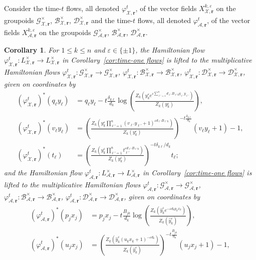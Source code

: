 \documentclass{amsart}
\newtheorem{corollary}[theorem]{Corollary}
\numberwithin{equation}{section}
\newcommand{\bfr}{{\boldsymbol{r}}}
\newcommand{\cA}{\mathcal{A}}
\newcommand{\cB}{\mathcal{B}}
\newcommand{\cD}{\mathcal{D}}
\newcommand{\cG}{\mathcal{G}}
\newcommand{\cX}{\mathcal{X}}
\begin{document}
Consider the time-$t$ flows, all denoted $\varphi_{\cX,\bfr}^t$, of the vector fields $X_{\cX,\bfr}^{k,\varepsilon}$ on the groupoids $\cG^\times_{\cX,\bfr}$, $\cB^\times_{\cX,\bfr}$, $\cD^\times_{\cX,\bfr}$ and the time-$t$ flows, all denoted $\varphi_{\cA,\bfr}^t$, of the vector fields $X_{\cA,\bfr}^{k,\varepsilon}$ on the groupoids $\cG^\times_{\cA,\bfr}$, $\cB^\times_{\cA,\bfr}$, $\cD^\times_{\cA,\bfr}$.
\begin{corollary}
  \label{cor:groupoid hamiltonian flows}
  For $1\le k\le n$ and $\varepsilon\in\{\pm1\}$, the Hamiltonian flow $\varphi_{\cX,\bfr}^t: L^\times_{\cX,\bfr} \to L^\times_{\cX,\bfr}$ in Corollary~\ref{cor:time-one flows} is lifted to the multiplicative Hamiltonian flows $\varphi_{\cX,\bfr}^t: \cG^\times_{\cX,\bfr} \to \cG^\times_{\cX,\bfr}$, $\varphi_{\cX,\bfr}^t: \cB^\times_{\cX,\bfr} \to \cB^\times_{\cX,\bfr}$, $\varphi_{\cX,\bfr}^t: \cD^\times_{\cX,\bfr} \to \cD^\times_{\cX,\bfr}$, given on coordinates by
  \begin{align*}
    (\varphi_{\cX,\bfr}^t)^*(q_\ell y_\ell)&=q_\ell y_\ell-t\frac{\delta_{k\ell}}{d_k}\log\left(\frac{Z_k\left(y_k^\varepsilon e^{\varepsilon\sum_{\ell'=1}^n d_{\ell'} B_{\ell' k}q_{\ell'} y_{\ell'}}\right)}{Z_k(y_k^\varepsilon)}\right),\\
    (\varphi_{\cX,\bfr}^t)^*(v_\ell y_\ell)&=\left(\frac{Z_k\left(y_k^\varepsilon \prod_{\ell'=1}^n (v_{\ell'} y_{\ell'} + 1)^{\varepsilon d_{\ell'} B_{\ell' k}}\right)}{Z_k(y_k^\varepsilon)}\right)^{-t\frac{\delta_{k\ell}}{d_k}}(v_\ell y_\ell+1)-1,\\
    (\varphi_{\cX,\bfr}^t)^*(t_\ell)&=\left(\frac{Z_k\left(y_k^\varepsilon \prod_{\ell'=1}^n t_{\ell'}^{\varepsilon d_{\ell'} B_{\ell' k}}\right)}{Z_k(y_k^\varepsilon)}\right)^{-t\delta_{k\ell}/d_k}t_\ell;
  \end{align*}
  and the Hamiltonian flow $\varphi_{\cA,\bfr}^t: L^\times_{\cA,\bfr} \to L^\times_{\cA,\bfr}$ in Corollary~\ref{cor:time-one flows} is lifted to the multiplicative Hamiltonian flows $\varphi_{\cA,\bfr}^t: \cG^\times_{\cA,\bfr} \to \cG^\times_{\cA,\bfr}$, $\varphi_{\cA,\bfr}^t: \cB^\times_{\cA,\bfr} \to \cB^\times_{\cA,\bfr}$, $\varphi_{\cA,\bfr}^t: \cD^\times_{\cA,\bfr} \to \cD^\times_{\cA,\bfr}$, given on coordinates by
  \begin{align*}
    (\varphi_{\cA,\bfr}^t)^*(p_jx_j)&=p_jx_j-t\frac{B_{jk}}{d_k}\log\left(\frac{Z_k\left(\hat y_k^\varepsilon e^{-\varepsilon d_kp_kx_k}\right)}{Z_k(\hat y_k^\varepsilon)}\right), \\
    (\varphi_{\cA,\bfr}^t)^*(u_jx_j)&=\left(\frac{Z_k\left(\hat y_k^\varepsilon (u_kx_k+1)^{-\varepsilon d_k}\right)}{Z_k(\hat y_k^\varepsilon)}\right)^{-t\frac{B_{jk}}{d_k}}(u_jx_j+1)-1, \\

\end{align*}
\end{corollary}
\end{document}

